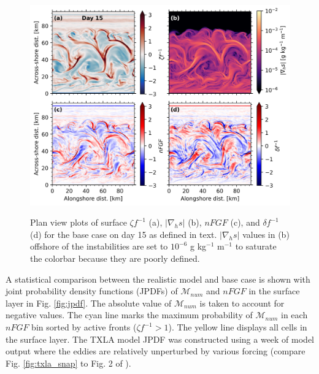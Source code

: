 \begin{figure}[t!]
    \begin{center}
    \includegraphics[width = \linewidth]{figures/shelfstrat_2024/surface_properties_day15.jpg}\\
    \caption{Plan view plots of surface $\zeta f^{-1}$ (a), $|\nabla_h s|$ (b), $nFGF$ (c), and $\delta f^{-1}$ (d) for the base case on day 15 as defined in text. $|\nabla_h s|$ values in (b) offshore of the instabilities are set to $10^{-6}$ g kg$^{-1}$ m$^{-1}$ to saturate the colorbar because they are poorly defined.}
    \label{fig:base_case_plan}
     \end{center}
\end{figure}

A statistical comparison between the realistic model and base case is shown with joint probability density functions (JPDFs) of $\mathcal{M}_{num}$ and $nFGF$ in the surface layer in Fig. \ref{fig:jpdf}. The absolute value of $\mathcal{M}_{num}$ is taken to account for negative values. The cyan line marks the maximum probability of $\mathcal{M}_{num}$ in each $nFGF$ bin sorted by active fronts ($\zeta f^{-1}>1$). The yellow line displays all cells in the surface layer. The TXLA model JPDF was constructed using a week of model output where the eddies are relatively unperturbed by various forcing (compare Fig. \ref{fig:txla_snap} to Fig. 2 of \citet{Schlichting23}). 

